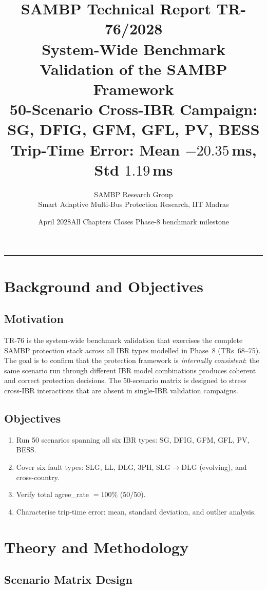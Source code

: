 \documentclass[11pt, a4paper]{article}
\title{\textbf{\textsf{\color{sambpblue}SAMBP Technical Report TR-76/2028}}\\[6pt]
  \Large System-Wide Benchmark Validation of the SAMBP Framework\\[4pt]
  \normalsize 50-Scenario Cross-IBR Campaign: SG, DFIG, GFM, GFL, PV, BESS\\
  Trip-Time Error: Mean $-20.35$\,ms, Std $1.19$\,ms}
\author{SAMBP Research Group\\[2pt]
  \small Smart Adaptive Multi-Bus Protection Research, IIT Madras}
\date{April 2028\quad\textbar\quad All Chapters\quad\textbar\quad
  Closes Phase-8 benchmark milestone}
\begin{document}
\maketitle
\tableofcontents
\vspace{6pt}\hrule\vspace{10pt}

\section{Background and Objectives}
\label{sec:background}

\subsection{Motivation}

TR-76 is the system-wide benchmark validation that exercises the complete
SAMBP protection stack across all IBR types modelled in Phase~8
(TRs~68--75). The goal is to confirm that the protection framework is
\emph{internally consistent}: the same scenario run through different
IBR model combinations produces coherent and correct protection decisions.
The 50-scenario matrix is designed to stress cross-IBR interactions that
are absent in single-IBR validation campaigns.

\subsection{Objectives}

\begin{enumerate}
  \item Run 50 scenarios spanning all six IBR types: SG, DFIG, GFM, GFL, PV, BESS.
  \item Cover six fault types: SLG, LL, DLG, 3PH, SLG$\to$DLG (evolving),
    and cross-country.
  \item Verify total agree\_rate $= 100\%$ (50/50).
  \item Characterise trip-time error: mean, standard deviation, and outlier analysis.
\end{enumerate}

\section{Theory and Methodology}
\label{sec:theory}

\subsection{Scenario Matrix Design}
\end{document}
